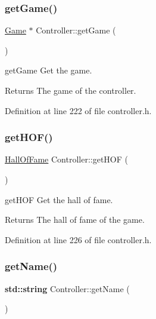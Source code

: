 \subsubsection{\texorpdfstring{get\+Game()}{getGame()}}
{\footnotesize\ttfamily \hyperlink{class_game}{Game} $\ast$ Controller\+::get\+Game (\begin{DoxyParamCaption}{ }\end{DoxyParamCaption})\hspace{0.3cm}{\ttfamily [inline]}}



get\+Game Get the game. 

\begin{DoxyReturn}{Returns}
The game of the controller. 
\end{DoxyReturn}


Definition at line 222 of file controller.\+h.

\mbox{\label{class_controller_abdad52832c8cd32d0f1e0c51442bda4c}} 
\subsubsection{\texorpdfstring{get\+H\+O\+F()}{getHOF()}}
{\footnotesize\ttfamily \hyperlink{class_hall_of_fame}{Hall\+Of\+Fame} Controller\+::get\+H\+OF (\begin{DoxyParamCaption}{ }\end{DoxyParamCaption})\hspace{0.3cm}{\ttfamily [inline]}}



get\+H\+OF Get the hall of fame. 

\begin{DoxyReturn}{Returns}
The hall of fame of the game. 
\end{DoxyReturn}


Definition at line 226 of file controller.\+h.

\mbox{\label{class_controller_ac60aa220e5bf8cd0329b585c817bb5c4}} 
\subsubsection{\texorpdfstring{get\+Name()}{getName()}}
{\footnotesize\ttfamily \textbf{ std\+::string} Controller\+::get\+Name (\begin{DoxyParamCaption}{ }\end{DoxyParamCaption})\hspace{0.3cm}{\ttfamily [inline]}}




